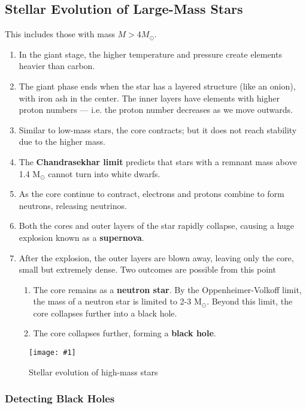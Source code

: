 \documentclass[a4paper,12pt]{article}
\newcommand{\img}[4]{\begin{center}
  \begin{figure}[H]
    \centering
    \texttt{[image: \#1]}
    \caption{#3}
    \label{fig:#4}
  \end{figure}
\end{center}}
\begin{document}
\pagebreak

\subsection{Stellar Evolution of Large-Mass Stars}

This includes those with mass $M > 4M_{\odot}$.
\begin{enumerate}
  \item In the giant stage, the higher temperature and pressure create elements heavier than carbon.
  \item The giant phase ends when the star has a layered structure (like an onion), with iron ash in the center. The inner layers have elements with higher proton numbers --- i.e. the proton number decreases as we move outwards.
  \item Similar to low-mass stars, the core contracts; but it does not reach stability due to the higher mass.
  \item The \textbf{Chandrasekhar limit} predicts that stars with a remnant mass above 1.4 M$_{\odot}$ cannot turn into white dwarfs.
  \item As the core continue to contract, electrons and protons combine to form neutrons, releasing neutrinos.
  \item Both the cores and outer layers of the star rapidly collapse, causing a huge explosion known as a \textbf{supernova}.
  \item After the explosion, the outer layers are blown away, leaving only the core, small but extremely dense. Two outcomes are possible from this point
        \begin{enumerate}
          \item The core remains as a \textbf{neutron star}. By the Oppenheimer-Volkoff limit, the mass of a neutron star is limited to 2-3 M$_{\odot}$. Beyond this limit, the core collapses further into a black hole.
          \item The core collapses further, forming a \textbf{black hole}.
        \end{enumerate}
\end{enumerate}

\img{highmass.png}{1}{Stellar evolution of high-mass stars}{highmass1}

\subsubsection{Detecting Black Holes}
\end{document}
